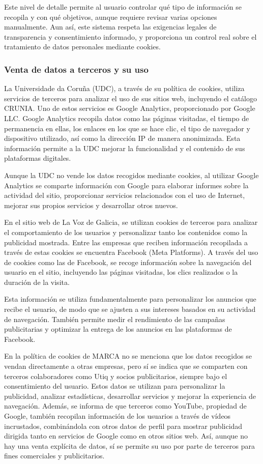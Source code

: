 Este nivel de detalle permite al usuario controlar qué tipo de información se recopila y con qué objetivos, aunque requiere revisar varias opciones manualmente. Aun así, este sistema respeta las exigencias legales de transparencia y consentimiento informado, y proporciona un control real sobre el tratamiento de datos personales mediante cookies. 


\subsubsection{Venta de datos a terceros y su uso}

La Universidade da Coruña (UDC), a través de su política de cookies, utiliza servicios de terceros para analizar el uso de sus sitios web, incluyendo el catálogo CRUNIA. Uno de estos servicios es Google Analytics, proporcionado por Google LLC. Google Analytics recopila datos como las páginas visitadas, el tiempo de permanencia en ellas, los enlaces en los que se hace clic, el tipo de navegador y dispositivo utilizado, así como la dirección IP de manera anonimizada. Esta información permite a la UDC mejorar la funcionalidad y el contenido de sus plataformas digitales. 

Aunque la UDC no vende los datos recogidos mediante cookies, al utilizar Google Analytics se comparte información con Google para elaborar informes sobre la actividad del sitio, proporcionar servicios relacionados con el uso de Internet, mejorar sus propios servicios y desarrollar otros nuevos. 


En el sitio web de La Voz de Galicia, se utilizan cookies de terceros para analizar el comportamiento de los usuarios y personalizar tanto los contenidos como la publicidad mostrada. Entre las empresas que reciben información recopilada a través de estas cookies se encuentra Facebook (Meta Platforms). A través del uso de cookies como las de Facebook, se recoge información sobre la navegación del usuario en el sitio, incluyendo las páginas visitadas, los clics realizados o la duración de la visita. 

Esta información se utiliza fundamentalmente para personalizar los anuncios que recibe el usuario, de modo que se ajusten a sus intereses basados en su actividad de navegación. También permite medir el rendimiento de las campañas publicitarias y optimizar la entrega de los anuncios en las plataformas de Facebook. 


En la política de cookies de MARCA no se menciona que los datos recogidos se vendan directamente a otras empresas, pero sí se indica que se comparten con terceros colaboradores como Utiq y socios publicitarios, siempre bajo el consentimiento del usuario. Estos datos se utilizan para personalizar la publicidad, analizar estadísticas, desarrollar servicios y mejorar la experiencia de navegación. Además, se informa de que terceros como YouTube, propiedad de Google, también recopilan información de los usuarios a través de vídeos incrustados, combinándola con otros datos de perfil para mostrar publicidad dirigida tanto en servicios de Google como en otros sitios web. Así, aunque no hay una venta explícita de datos, sí se permite su uso por parte de terceros para fines comerciales y publicitarios.